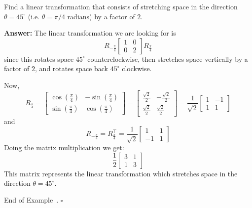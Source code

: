 \documentclass[10pt]{article}
\theoremstyle{definition}
\newtheorem{example}[theorem]{Example}
\renewenvironment{example}
{\begin{oldexample}}
  {\par\smallskip\hfill   End of Example~\theexample. $\square$    \par\end{oldexample}}
\newcommand{\fl}[1]{\noindent\textbf{#1}}            %
\begin{document}
\begin{example}
  Find a linear transformation that consists of stretching space in the
  direction $\theta=45^{\circ}$ (i.e. $\theta=\pi/4$ radians) by a factor of
  $2$.

  \fl{Answer:} The linear transformation we are looking for is
  \begin{equation*}
    R_{-\frac{\pi}{4}}
    \begin{bmatrix}
      1&0\\
      0&2
    \end{bmatrix}
    R_{\frac{\pi}{4}}
  \end{equation*}
  since this rotates space $45^{\circ}$ counterclockwise, then stretches space vertically by a
  factor of $2$, and rotates space back $45^{\circ}$ clockwise.

  Now,
  \begin{equation*}
    R_{\frac{\pi}{4}}
    =
    \begin{bmatrix}
      \cos(\frac{\pi}{4})&-\sin(\frac{\pi}{4})\\
      \sin(\frac{\pi}{4})& \cos(\frac{\pi}{4})
    \end{bmatrix}
    =
    \begin{bmatrix}
      \frac{\sqrt{2}}{2}& -\frac{\sqrt{2}}{2}\\
      \frac{\sqrt{2}}{2}& \frac{\sqrt{2}}{2}
    \end{bmatrix}
    =
    \frac{1}{\sqrt{2}}
    \begin{bmatrix}
      1&-1\\
      1&1
    \end{bmatrix}
  \end{equation*}
  and
  \begin{equation*}
    R_{-\frac{\pi}{4}} = R_{\frac{\pi}{4}}^{\top} = \frac{1}{\sqrt{2}}
    \begin{bmatrix}
      1&1\\
      -1&1
    \end{bmatrix}
  \end{equation*}
  Doing the matrix multiplication we get:
  \begin{equation*}
    \frac{1}{2}
    \begin{bmatrix}
      3&1\\1&3
    \end{bmatrix}
  \end{equation*}
  This matrix represents the linear transformation which stretches space in
  the direction $\theta=45^{\circ}$.
\end{example}
\end{document}
